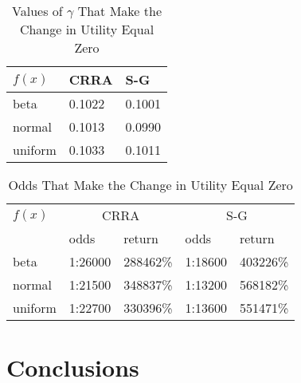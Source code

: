 \documentclass[letterpaper,12pt]{article}
\numberwithin{equation}{section}
\numberwithin{figure}{section}
\numberwithin{table}{section}
\begin{document}
\begin{spacing}{1.5}
	\begin{table}[ht] 
		\caption{Values of $\gamma$ That Make the Change in Utility Equal Zero}
		\label{tab_lottery2}
		\centering
		\begin{tabular}{|l|ll|}
		    \hline
			$f(x)$ & CRRA & S-G \\
			\hline
			beta & 0.1022 & 0.1001 \\
			normal & 0.1013 & 0.0990 \\
			uniform & 0.1033 & 0.1011 \\
			\hline
		\end{tabular}
	\end{table}

	\begin{table}[ht] 
		\caption{Odds That Make the Change in Utility Equal Zero}
		\label{tab_lottery3}
		\centering
		\begin{tabular}{|l|ll|ll|}
		    \hline
			$f(x)$ & \multicolumn{2}{c}{CRRA} & \multicolumn{2}{c}{S-G} \\
			& odds & return & odds & return \\
			\hline
			beta & 1:26000 & 288462\% & 1:18600 & 403226\% \\
			normal & 1:21500 & 348837\% & 1:13200 & 568182\% \\
			uniform & 1:22700 & 330396\% & 1:13600 & 551471\% \\
			\hline
		\end{tabular}
	\end{table}


\FloatBarrier

\section{Conclusions} \label{sec_concl}
	

%

\end{spacing}
\end{document}
